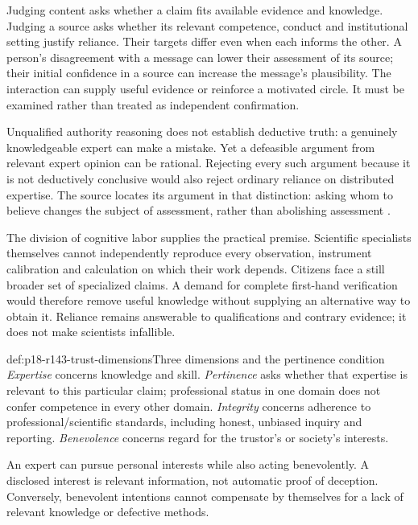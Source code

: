 Judging content asks whether a claim fits available evidence and knowledge.
Judging a source asks whether its relevant competence, conduct and
institutional setting justify reliance. Their targets differ even when
each informs the other. A person's disagreement with a message can lower
their assessment of its source; their initial confidence in a source
can increase the message's plausibility. The interaction can supply
useful evidence or reinforce a motivated circle. It must be examined
rather than treated as independent confirmation.

Unqualified authority reasoning does not establish deductive truth:
a genuinely knowledgeable expert can make a mistake. Yet a defeasible
argument from relevant expert opinion can be rational. Rejecting every
such argument because it is not deductively conclusive would also reject
ordinary reliance on distributed expertise. The source locates its
argument in that distinction: asking whom to believe changes the subject
of assessment, rather than abolishing assessment
\cite[pp.~769--770]{BrommeGierth2021PublicScience}.

The division of cognitive labor supplies the practical premise. Scientific
specialists themselves cannot independently reproduce every observation,
instrument calibration and calculation on which their work depends.
Citizens face a still broader set of specialized claims. A demand for
complete first-hand verification would therefore remove useful knowledge
without supplying an alternative way to obtain it. Reliance remains
answerable to qualifications and contrary evidence; it does not make
scientists infallible.

\begin{hbdefinition}{def:p18-r143-trust-dimensions}{Three dimensions and the pertinence condition}
\emph{Expertise} concerns knowledge and skill. \emph{Pertinence} asks
whether that expertise is relevant to this particular claim; professional
status in one domain does not confer competence in every other domain.
\emph{Integrity} concerns adherence to professional/scientific standards,
including honest, unbiased inquiry and reporting. \emph{Benevolence}
concerns regard for the trustor's or society's interests.

An expert can pursue personal interests while also acting benevolently.
A disclosed interest is relevant information, not automatic proof of
deception. Conversely, benevolent intentions cannot compensate by
themselves for a lack of relevant knowledge or defective methods.
\end{hbdefinition}

